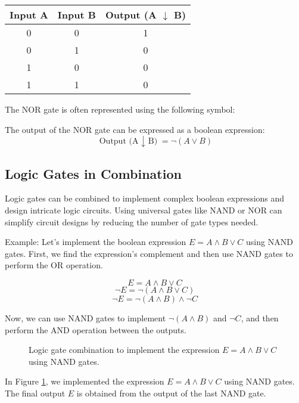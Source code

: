 \documentclass{article}
\begin{document}
\begin{center}
  \begin{tabular}{|c|c|c|}
    \hline
    \textbf{Input A} & \textbf{Input B} & \textbf{Output (A $\downarrow$ B)} \\
    \hline
    0 & 0 & 1 \\
    0 & 1 & 0 \\
    1 & 0 & 0 \\
    1 & 1 & 0 \\
    \hline
  \end{tabular}
  \end{center}

The NOR gate is often represented using the following symbol:

\begin{center}
\end{center}

The output of the NOR gate can be expressed as a boolean expression:
\[ \text{Output (A $\downarrow$ B)} = \lnot (A \lor B) \]

\subsection{Logic Gates in Combination}

Logic gates can be combined to implement complex boolean expressions and design intricate logic circuits. Using universal gates like NAND or NOR can simplify circuit designs by reducing the number of gate types needed.

Example: Let's implement the boolean expression $E = A \land B \lor C$ using NAND gates. First, we find the expression's complement and then use NAND gates to perform the OR operation.

\[ E = A \land B \lor C \]
\[ \lnot E = \lnot (A \land B \lor C) \]
\[ \lnot E = \lnot (A \land B) \land \lnot C \]

Now, we can use NAND gates to implement $\lnot (A \land B)$ and $\lnot C$, and then perform the AND operation between the outputs.

\begin{figure}[h]
  \centering
  \caption{Logic gate combination to implement the expression $E = A \land B \lor C$ using NAND gates.}
  \label{fig:nand_gate_combination}
\end{figure}

In Figure \ref{fig:nand_gate_combination}, we implemented the expression $E = A \land B \lor C$ using NAND gates. The final output $E$ is obtained from the output of the last NAND gate.
\end{document}

